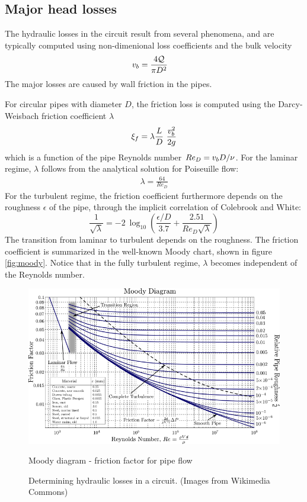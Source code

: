 \subsection{Major head losses}
\label{sec:hydraulicLosses}

The hydraulic losses in the circuit result from several phenomena, and
are typically computed using non-dimenional loss coefficients and the
bulk velocity
\begin{align*} 
  v_b &= \frac{4 \mathcal Q}{\pi D^2}
\end{align*}
The major losses are caused by wall friction in the pipes. 

For circular pipes with diameter $D$, the friction loss is computed
using the Darcy-Weisbach friction coefficient $\lambda$
\begin{equation}
  \xi_f = \lambda \frac{L}{D}~\frac{v_b^2}{2g}
  \label{eq:frictionLossDarcyWeisbach}
\end{equation}
which is a function of the pipe Reynolds number $Re_D = v_b D /
\nu$. For the laminar regime, $\lambda$ follows from the
analytical solution for Poiseuille flow:
\begin{align}
  \lambda = \frac{64}{Re_D} 
  \label{eq:frictionFactorLaminar}
\end{align}
For the turbulent regime, the friction coefficient furthermore depends
on the roughness $\epsilon$ of the pipe, \eg through the implicit
correlation of Colebrook and White:
\begin{equation}
  \frac{1}{\sqrt{\lambda}} = -
  2~\log_{10}\left(\frac{\epsilon/D}{3.7} + \frac{2.51}{Re_D
      \sqrt{\lambda}}\right)
  \label{eq:frictionFactorColebrook}
\end{equation}
The transition from laminar to turbulent depends on the roughness. The
friction coefficient is summarized in the well-known Moody chart,
shown in figure \ref{fig:moody}. Notice that in the fully turbulent
regime, $\lambda$ becomes independent of the Reynolds number.
\begin{figure}[!h]
    \includegraphics[width=\textwidth]{hydrodynamics/MoodyDiagram.png}
    \caption{Moody diagram - friction factor for pipe flow}
    \label{fig:moody}
  \caption{Determining hydraulic losses in a circuit. (Images from
    Wikimedia Commons)}
  \label{fig:hydraulicLosses}
\end{figure}
